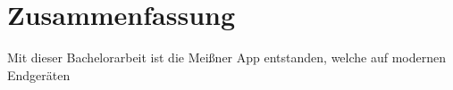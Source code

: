 \chapter{Zusammenfassung}
Mit dieser Bachelorarbeit ist die Meißner App entstanden, welche auf modernen Endgeräten 